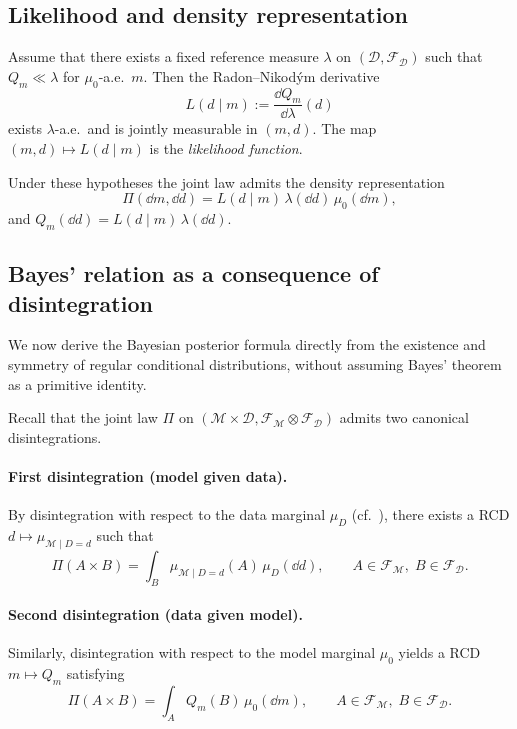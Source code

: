 \documentclass[11pt]{article}
\theoremstyle{remark}
\newcommand{\modelspace}{\mathcal{M}}
\newcommand{\dataspace}{\mathcal{D}}
\begin{document}
\subsection{Likelihood and density representation}

Assume that there exists a fixed reference measure
\(\lambda\) on \((\dataspace,\mathcal F_{\dataspace})\) such that
\(Q_m\ll\lambda\) for \(\mu_0\)-a.e.\ \(m\).  Then the Radon--Nikodým derivative
\begin{equation}\label{eq:likelihood-def}
  L(d\mid m)
  :=
  \frac{\dd Q_m}{\dd\lambda}(d)
\end{equation}
exists \(\lambda\)-a.e.\ and is jointly measurable in
\((m,d)\).  The map
\((m,d)\mapsto L(d\mid m)\) is the \emph{likelihood function}.

Under these hypotheses the joint law admits the density representation
\begin{equation}\label{eq:joint-density}
  \Pi(\dd m,\dd d)
  =
  L(d\mid m)\,\lambda(\dd d)\,\mu_0(\dd m),
\end{equation}
and \(Q_m(\dd d)=L(d\mid m)\,\lambda(\dd d)\).

\subsection{Bayes' relation as a consequence of disintegration}

We now derive the Bayesian posterior formula directly from the existence and
symmetry of regular conditional distributions, without assuming Bayes'
theorem as a primitive identity.

Recall that the joint law \(\Pi\) on
\((\modelspace\times\dataspace,
  \mathcal F_{\modelspace}\otimes\mathcal F_{\dataspace})\)
admits two canonical disintegrations.

\paragraph{First disintegration (model given data).}
By disintegration with respect to the data marginal \(\mu_D\)
(cf.~\cite[Theorem~5.4]{Kallenberg2021}), there exists a RCD
\(d\mapsto\mu_{\modelspace\mid D=d}\) such that
\begin{equation}\label{eq:bayes-step-1}
  \Pi(A\times B)
  =
  \int_B \mu_{\modelspace\mid D=d}(A)\,\mu_D(\dd d),
  \qquad
  A\in\mathcal F_{\modelspace},\;
  B\in\mathcal F_{\dataspace}.
\end{equation}

\paragraph{Second disintegration (data given model).}
Similarly, disintegration with respect to the model marginal \(\mu_0\)
yields a RCD \(m\mapsto Q_m\) satisfying
\begin{equation}\label{eq:bayes-step-2}
  \Pi(A\times B)
  =
  \int_A Q_m(B)\,\mu_0(\dd m),
  \qquad
  A\in\mathcal F_{\modelspace},\;
  B\in\mathcal F_{\dataspace}.
\end{equation}
\end{document}
